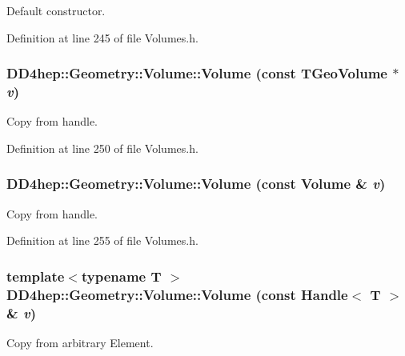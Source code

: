 Default constructor. 

Definition at line 245 of file Volumes.h.\hypertarget{class_d_d4hep_1_1_geometry_1_1_volume_ac5e2f7fc0aeafa1ca916e01e8a159c29}{
\subsubsection[{Volume}]{\setlength{\rightskip}{0pt plus 5cm}DD4hep::Geometry::Volume::Volume (const TGeoVolume $\ast$ {\em v})}}
\label{class_d_d4hep_1_1_geometry_1_1_volume_ac5e2f7fc0aeafa1ca916e01e8a159c29}


Copy from handle. 

Definition at line 250 of file Volumes.h.\hypertarget{class_d_d4hep_1_1_geometry_1_1_volume_ac9854eb2a3029d348c04643e44abbea4}{
\subsubsection[{Volume}]{\setlength{\rightskip}{0pt plus 5cm}DD4hep::Geometry::Volume::Volume (const {\bf Volume} \& {\em v})}}
\label{class_d_d4hep_1_1_geometry_1_1_volume_ac9854eb2a3029d348c04643e44abbea4}


Copy from handle. 

Definition at line 255 of file Volumes.h.\hypertarget{class_d_d4hep_1_1_geometry_1_1_volume_a94b33c96ae6d3156333dcbc025808201}{
\subsubsection[{Volume}]{\setlength{\rightskip}{0pt plus 5cm}template$<$typename T $>$ DD4hep::Geometry::Volume::Volume (const {\bf Handle}$<$ {\bf T} $>$ \& {\em v})}}
\label{class_d_d4hep_1_1_geometry_1_1_volume_a94b33c96ae6d3156333dcbc025808201}


Copy from arbitrary Element. 


